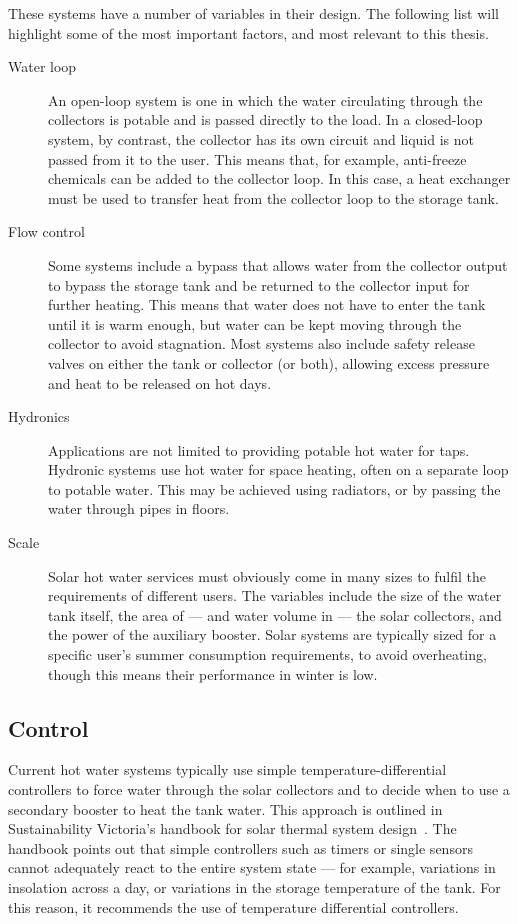 These systems have a number of variables in their design.
The following list will highlight some of the most important factors, and most relevant to this thesis.

\begin{description}
   \item[Water loop] An open-loop system is one in which the water circulating through the collectors is potable and is passed directly to the load.
      In a closed-loop system, by contrast, the collector has its own circuit and liquid is not passed from it to the user.
      This means that, for example, anti-freeze chemicals can be added to the collector loop.
      In this case, a heat exchanger must be used to transfer heat from the collector loop to the storage tank.

   \item[Flow control] Some systems include a bypass that allows water from the collector output to bypass the storage tank and be returned to the collector input for further heating.
      This means that water does not have to enter the tank until it is warm enough, but water can be kept moving through the collector to avoid stagnation.
      Most systems also include safety release valves on either the tank or collector (or both), allowing excess pressure and heat to be released on hot days.

   \item[Hydronics] Applications are not limited to providing potable hot water for taps.
      Hydronic systems use hot water for space heating, often on a separate loop to potable water.
      This may be achieved using radiators, or by passing the water through pipes in floors.

   \item[Scale] Solar hot water services must obviously come in many sizes to fulfil the requirements of different users.
      The variables include the size of the water tank itself, the area of --- and water volume in --- the solar collectors, and the power of the auxiliary booster.
      Solar systems are typically sized for a specific user's summer consumption requirements, to avoid overheating, though this means their performance in winter is low.
\end{description}

\subsection{Control}

Current hot water systems typically use simple temperature-differential controllers to force water through the solar collectors and to decide when to use a secondary booster to heat the tank water.
This approach is outlined in Sustainability Victoria's handbook for solar thermal system design~\cite{LSTS}.
The handbook points out that simple controllers such as timers or single sensors cannot adequately react to the entire system state --- for example, variations in insolation across a day, or variations in the storage temperature of the tank.
For this reason, it recommends the use of temperature differential controllers.


